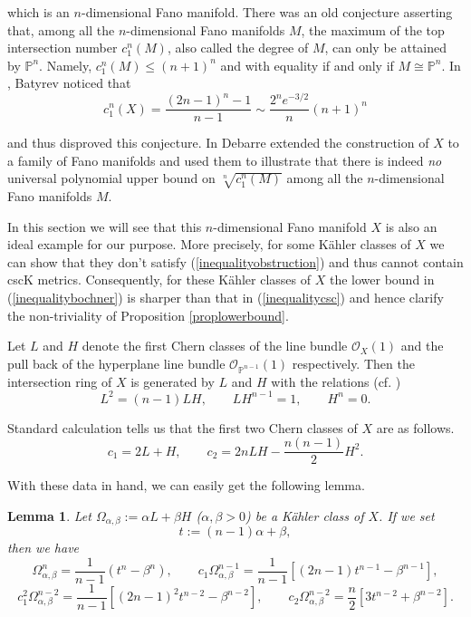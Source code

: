 \documentclass[11pt]{amsart}
\newtheorem{lemma}[theorem]{Lemma}
\theoremstyle{definition}
\theoremstyle{remark}
\numberwithin{equation}{section}
\begin{document}
which is an $n$-dimensional Fano manifold. There was an old
conjecture asserting that, among all the $n$-dimensional Fano
manifolds $M$, the maximum of the top intersection number
$c_1^n(M)$, also called the degree of $M$, can only be attained by
$\mathbb{P}^n$. Namely, $c_1^n(M)\leq(n+1)^n$ and with equality if
and only if $M\cong\mathbb{P}^n$. In \cite{Ba}, Batyrev noticed that
$$c_1^n(X)=\frac{(2n-1)^n-1}{n-1}\sim\frac{2^ne^{-3/2}}{n}(n+1)^n$$

and thus disproved this conjecture. In \cite[p. 137-139]{De} Debarre
extended the construction of $X$ to a family of Fano manifolds and
used them to illustrate that there is indeed \emph{no} universal
polynomial upper bound on $\sqrt[n]{c_1^n(M)}$ among all the
$n$-dimensional Fano manifolds $M$.

In this section we will see that this $n$-dimensional Fano manifold
$X$ is also an ideal example for our purpose. More precisely, for
some K\"{a}hler classes of $X$ we can show that they don't satisfy
(\ref{inequalityobstruction}) and thus cannot contain cscK metrics.
Consequently, for these K\"{a}hler classes of $X$ the lower bound in
(\ref{inequalitybochner}) is sharper than that in
(\ref{inequalitycsc}) and hence clarify the non-triviality of
Proposition \ref{proplowerbound}.

Let $L$ and $H$ denote the first Chern classes of the line bundle
$\mathcal{O}_X(1)$ and the pull back of the hyperplane line bundle
$\mathcal{O}_{\mathbb{P}^{n-1}}(1)$ respectively. Then the
intersection ring of $X$ is generated by $L$ and $H$ with the
relations (cf. \cite[p. 138]{De})
\begin{equation}\label{relation}L^2=(n-1)LH,\qquad LH^{n-1}=1,\qquad H^n=0.\end{equation}

Standard calculation tells us that the first two Chern classes of
$X$ are as follows.
$$c_1=2L+H,\qquad c_2=2nLH-\frac{n(n-1)}{2}H^2.$$

With these data in hand, we can easily get the following lemma.

\begin{lemma}\label{lemmacompute}
Let $\Omega_{\alpha,\beta}:=\alpha L+\beta H$ ($\alpha,\beta>0$) be
a K\"{a}hler class of $X$. If we set
$$t:=(n-1)\alpha+\beta,$$
then we have
$$\Omega_{\alpha,\beta}^n=\frac{1}{n-1}(t^n-\beta^n),\qquad
c_1\Omega_{\alpha,\beta}^{n-1}=\frac{1}{n-1}[(2n-1)t^{n-1}-\beta^{n-1}],$$
$$c_1^2\Omega_{\alpha,\beta}^{n-2}=\frac{1}{n-1}[(2n-1)^2t^{n-2}-\beta^{n-2}]
,\qquad
c_2\Omega_{\alpha,\beta}^{n-2}=\frac{n}{2}[3t^{n-2}+\beta^{n-2}].$$
\end{lemma}
\end{document}
